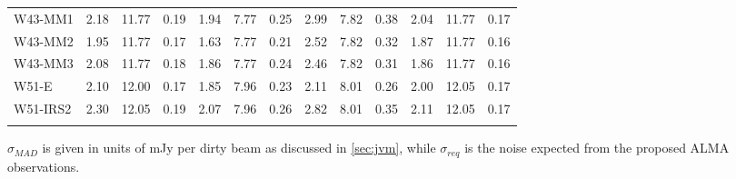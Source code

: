 \begin{table}[htbp!]
\begin{tabular}{@{\extracolsep{4pt}}lllllllllllll@{}}
W43-MM1  &  2.18 & 11.77 & 0.19 & 1.94 & 7.77 & 0.25 & 2.99 & 7.82 & 0.38 & 2.04 & 11.77 & 0.17 \\
W43-MM2  &  1.95 & 11.77 & 0.17 & 1.63 & 7.77 & 0.21 & 2.52 & 7.82 & 0.32 & 1.87 & 11.77 & 0.16 \\
W43-MM3  &  2.08 & 11.77 & 0.18 & 1.86 & 7.77 & 0.24 & 2.46 & 7.82 & 0.31 & 1.86 & 11.77 & 0.16 \\
W51-E  &  2.10 & 12.00 & 0.17 & 1.85 & 7.96 & 0.23 & 2.11 & 8.01 & 0.26 & 2.00 & 12.05 & 0.17 \\
W51-IRS2  &  2.30 & 12.05 & 0.19 & 2.07 & 7.96 & 0.26 & 2.82 & 8.01 & 0.35 & 2.11 & 12.05 & 0.17 \\


\hline \noalign {\smallskip}
\end{tabular}
\begin{tablenotes}
\item $\sigma_{MAD}$ is given in units of mJy per dirty beam as discussed in \cref{sec:jvm}, while $\sigma_{req}$ is the noise expected from the proposed ALMA observations.
\end{tablenotes}
\end{table}


